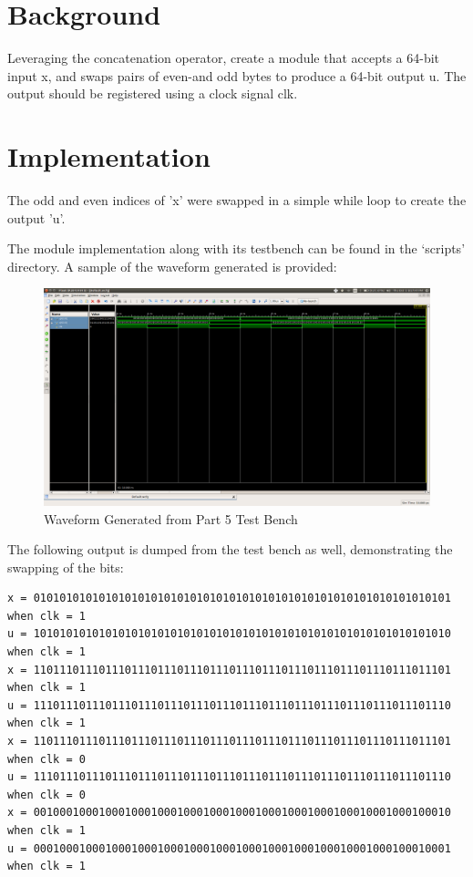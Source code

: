 \documentclass[paper=usletter, fontsize=12pt]{article}
\begin{document}
    \vspace{-0.1in}

    \section{Background}
    Leveraging the concatenation operator, create a module that accepts a 64-bit input x, and swaps pairs of even-and odd bytes to produce a 64-bit output u. The output should be registered using a clock signal clk.

    \section{Implementation}
    The odd and even indices of 'x' were swapped in a simple while loop to create the output 'u'.

    The module implementation along with its testbench can be found in the `scripts' directory. A sample of the waveform generated is provided:

    \begin{figure}[ht]
        \begin{center}
            \includegraphics[width=1\textwidth]{wav.png}
            \caption{Waveform Generated from Part 5 Test Bench} \label{fig:wav}
        \end{center}
    \end{figure}

    The following output is dumped from the test bench as well, demonstrating the swapping of the bits:

\begin{lstlisting}[language={}]
x = 0101010101010101010101010101010101010101010101010101010101010101 when clk = 1
u = 1010101010101010101010101010101010101010101010101010101010101010 when clk = 1
x = 1101110111011101110111011101110111011101110111011101110111011101 when clk = 1
u = 1110111011101110111011101110111011101110111011101110111011101110 when clk = 1
x = 1101110111011101110111011101110111011101110111011101110111011101 when clk = 0
u = 1110111011101110111011101110111011101110111011101110111011101110 when clk = 0
x = 0010001000100010001000100010001000100010001000100010001000100010 when clk = 1
u = 0001000100010001000100010001000100010001000100010001000100010001 when clk = 1
\end{lstlisting}
\end{document}
